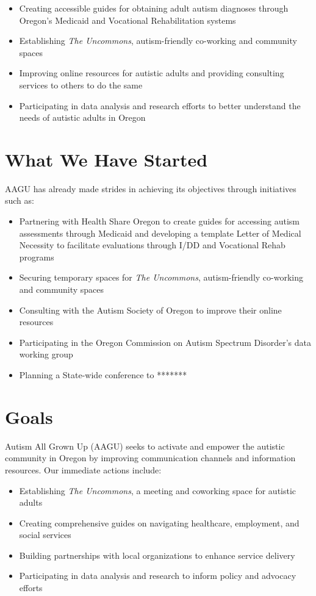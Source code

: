 \documentclass[
  letterpaper,
  DIV=11,
  numbers=noendperiod]{scrreprt}
\providecommand{\tightlist}{%
  \setlength{\itemsep}{0pt}\setlength{\parskip}{0pt}}\usepackage{longtable,booktabs,array}
\begin{document}
\begin{itemize}
\tightlist
\item
  Creating accessible guides for obtaining adult autism diagnoses
  through Oregon's Medicaid and Vocational Rehabilitation systems
\item
  Establishing \emph{The Uncommons}, autism-friendly co-working and
  community spaces
\item
  Improving online resources for autistic adults and providing
  consulting services to others to do the same
\item
  Participating in data analysis and research efforts to better
  understand the needs of autistic adults in Oregon
\end{itemize}

\section{What We Have Started}\label{sec-aagu_started}

AAGU has already made strides in achieving its objectives through
initiatives such as:

\begin{itemize}
\tightlist
\item
  Partnering with Health Share Oregon to create guides for accessing
  autism assessments through Medicaid and developing a template Letter
  of Medical Necessity to facilitate evaluations through I/DD and
  Vocational Rehab programs
\item
  Securing temporary spaces for \emph{The Uncommons}, autism-friendly
  co-working and community spaces
\item
  Consulting with the Autism Society of Oregon to improve their online
  resources
\item
  Participating in the Oregon Commission on Autism Spectrum Disorder's
  data working group
\item
  Planning a State-wide conference to *******
\end{itemize}

\section{Goals}\label{sec-aagu_goals}

Autism All Grown Up (AAGU) seeks to activate and empower the autistic
community in Oregon by improving communication channels and information
resources. Our immediate actions include:

\begin{itemize}
\tightlist
\item
  Establishing \emph{The Uncommons}, a meeting and coworking space for
  autistic adults
\item
  Creating comprehensive guides on navigating healthcare, employment,
  and social services
\item
  Building partnerships with local organizations to enhance service
  delivery
\item
  Participating in data analysis and research to inform policy and
  advocacy efforts
\end{itemize}
\end{document}
